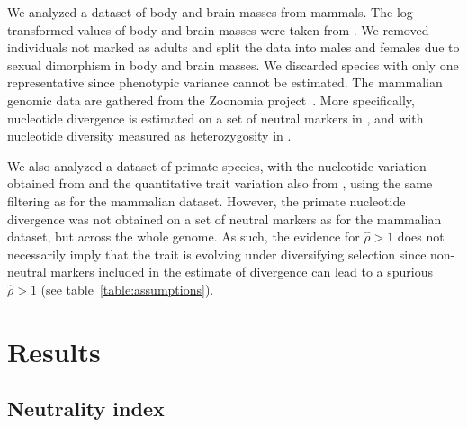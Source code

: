 \documentclass{article}
\newcommand{\NI}{\rho}
\newcommand{\EstNI}{\widehat{\rho}}
\providecommand{\DIFaddtex}[1]{{\protect\color{blue}\uwave{#1}}} %
\providecommand{\DIFdeltex}[1]{{\protect\color{red}\sout{#1}}}                      %
\providecommand{\DIFaddbegin}{} %
\providecommand{\DIFaddend}{} %
\providecommand{\DIFdelbegin}{} %
\providecommand{\DIFdelend}{} %
\providecommand{\DIFadd}[1]{\texorpdfstring{\DIFaddtex{#1}}{#1}} %
\providecommand{\DIFdel}[1]{\texorpdfstring{\DIFdeltex{#1}}{}} %
\newcommand{\DIFscaledelfig}{0.5}
\newlength{\DIFdelgraphicswidth} %
\newlength{\DIFdelgraphicsheight} %
\newcommand{\DIFaddincludegraphics}[2][]{{\color{blue}\fbox{\DIFOincludegraphics[#1]{#2}}}} %
\newcommand{\DIFdelincludegraphics}[2][]{%
\sbox{\DIFdelgraphicsbox}{\DIFOincludegraphics[#1]{#2}}%
\settoboxwidth{\DIFdelgraphicswidth}{\DIFdelgraphicsbox} %
\settoboxtotalheight{\DIFdelgraphicsheight}{\DIFdelgraphicsbox} %
\scalebox{\DIFscaledelfig}{%
\parbox[b]{\DIFdelgraphicswidth}{\usebox{\DIFdelgraphicsbox}\\[-\baselineskip] \rule{\DIFdelgraphicswidth}{0em}}\llap{\resizebox{\DIFdelgraphicswidth}{\DIFdelgraphicsheight}{%
\setlength{\unitlength}{\DIFdelgraphicswidth}%
\begin{picture}(1,1)%
\thicklines\linethickness{2pt} %
{\color[rgb]{1,0,0}\put(0,0){\framebox(1,1){}}}%
{\color[rgb]{1,0,0}\put(0,0){\line( 1,1){1}}}%
{\color[rgb]{1,0,0}\put(0,1){\line(1,-1){1}}}%
\end{picture}%
}\hspace*{3pt}}} %
} %
\DeclareRobustCommand{\DIFaddbegin}{\DIFOaddbegin \let\includegraphics\DIFaddincludegraphics} %
\DeclareRobustCommand{\DIFaddend}{\DIFOaddend \let\includegraphics\DIFOincludegraphics} %
\DeclareRobustCommand{\DIFdelbegin}{\DIFOdelbegin \let\includegraphics\DIFdelincludegraphics} %
\DeclareRobustCommand{\DIFdelend}{\DIFOaddend \let\includegraphics\DIFOincludegraphics} %
\begin{document}
We analyzed a dataset of body and brain masses from mammals.
The log-transformed values of body and brain masses were taken from \citet{tsuboi_breakdown_2018}.
We removed individuals not marked as adults and split the data into males and females due to sexual dimorphism in body and brain masses.
We discarded species with only one representative since phenotypic variance cannot be estimated.
The mammalian genomic data are gathered from the Zoonomia project~\citep{genereux_comparative_2020}.
More specifically, nucleotide divergence is estimated on a set of neutral markers in \citet{foley_genomic_2023}, and with nucleotide diversity measured as heterozygosity in \citet{wilder_contribution_2023}.

We also analyzed a dataset of primate species, with the nucleotide variation obtained from \citet{kuderna_global_2023} and the quantitative trait variation also from \citet{tsuboi_breakdown_2018}, using the same filtering as for the mammalian dataset.
However, the primate nucleotide divergence was not obtained on a set of neutral markers as for the mammalian dataset, but across the whole genome.
As such, the evidence for \DIFdelbegin \DIFdel{$\EstNI > 1$ }\DIFdelend \DIFaddbegin \DIFadd{$\NI > 1$ }\DIFaddend does not necessarily imply that the trait is evolving under diversifying selection since non-neutral markers included in the estimate of divergence can lead to a spurious \DIFdelbegin \DIFdel{$\EstNI > 1$ }\DIFdelend \DIFaddbegin \DIFadd{$\NI > 1$ }\DIFaddend (see table~\ref{table:assumptions}).

\section*{Results}\label{sec:results}

\subsection*{Neutrality index}
\end{document}

